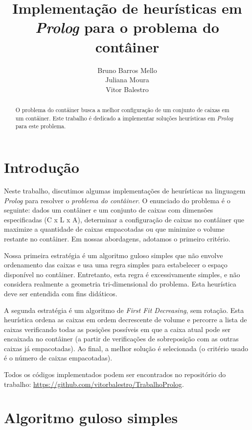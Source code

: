 \documentclass[12pt]{article}
\title{Implementação de heurísticas em \emph{Prolog} para o problema do contâiner}
\author{Bruno Barros Mello\inst{1} \\ Juliana Moura\inst{1} \\  Vitor
  Balestro\inst{1,2} }
\begin{document}
 

\maketitle

\begin{abstract} O problema do contâiner busca a melhor configuração de um conjunto de caixas em um contâiner. Este trabalho é dedicado a implementar soluções heurísticas em \emph{Prolog} para este problema.
  
\end{abstract}


\section{Introdução}

Neste trabalho, discutimos algumas implementações de heurísticas na linguagem \emph{Prolog} para resolver o \emph{problema do contâiner}. O enunciado do problema é o seguinte: dados um contâiner e um conjunto de caixas com dimensões especificadas (C x L x A), determinar a configuração de caixas no contâiner que maximize a quantidade de caixas empacotadas ou que minimize o volume restante no contâiner. Em nossas abordagens, adotamos o primeiro critério.

Nossa primeira estratégia é um algoritmo guloso simples que não envolve ordenamento das caixas e usa uma regra simples para estabelecer o espaço disponível no contâiner. Entretanto, esta regra é excessivamente simples, e não considera realmente a geometria tri-dimensional do problema. Esta heurística deve ser entendida com fins didáticos.

A segunda estratégia é um algoritmo de \emph{First Fit Decreasing}, sem rotação. Esta heurística ordena as caixas em ordem decrescente de volume e percorre a lista de caixas verificando todas as posições possíveis em que a caixa atual pode ser encaixada no contâiner (a partir de verificações de sobreposição com as outras caixas já empacotadas). Ao final, a melhor solução é selecionada (o critério usado é o número de caixas empacotadas).

Todos os códigos implementados podem ser encontrados no repositório do trabalho: \url{https://github.com/vitorbalestro/TrabalhoProlog}.

\section{Algoritmo guloso simples}
\end{document}
